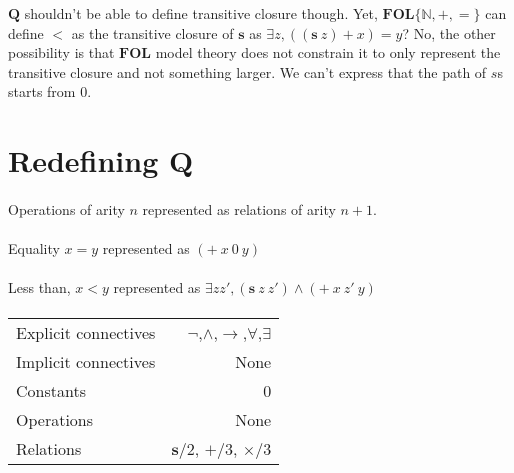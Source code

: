 \documentclass{article}
\begin{document}
$\mathbf{Q}$ shouldn't be able to define transitive closure though. Yet, $\mathbf{FOL}\{\mathbb{N},+, = \}$ can define $<$ as the transitive closure of $\mathbf{s}$ as $\exists z , ((\mathbf{s}\ z) + x) = y$? No, the other possibility is that $\mathbf{FOL}$ model theory does not constrain it to only represent the transitive closure and not something larger. We can't express that the path of $s$s starts from $0$.


\section{Redefining Q}
\paragraph{}
Operations of arity $n$ represented as relations of arity $n+1$.
\paragraph{}
Equality $x = y$ represented as $(+\ x\ 0\ y)$
\paragraph{}
Less than, $x < y$ represented as $\exists z z', (\mathbf{s}\ z\ z') \land (+\ x\ z'\ y)$

\paragraph{}

\begin{tabular}{l | r}
 \hline
 Explicit connectives & $\neg$,$\land$,$\rightarrow $,$\forall$,$\exists$ \\
 Implicit connectives & None \\
 Constants & 0 \\
 Operations & None \\
 Relations & $\mathbf{s}$/2, $+$/3, $\times$/3\\
 \hline
\end{tabular}
\end{document}
